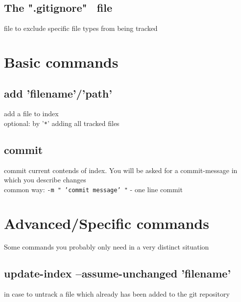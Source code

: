 \subsection*{The ".gitignore" \ file}
file to exclude specific file types from being tracked\\

\section*{Basic commands}

\subsection*{add 'filename'/'path'}
add a file to index\\
optional: by '\texttt{*}' adding all tracked files

\subsection*{commit}
commit current contends of index. You will be asked for a commit-message in which you describe changes\\
common way: \texttt{-m "\ 'commit message' "} - one line commit
\subsection*{}
\subsection*{}

\section*{Advanced/Specific commands}
Some commands you probably only need in a very distinct situation
\subsection*{update-index –assume-unchanged 'filename'}
in case to untrack a file which already has been added to the git repository
